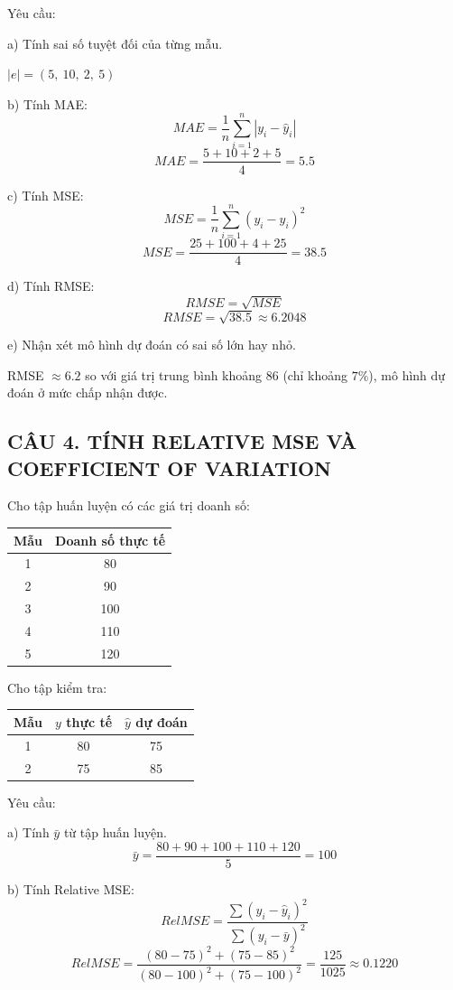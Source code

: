 \documentclass[a4paper,12pt]{article}
\begin{document}
Yêu cầu:

a) Tính sai số tuyệt đối của từng mẫu.

$|e| = (5,\ 10,\ 2,\ 5)$

b) Tính MAE:
\[ MAE = \frac{1}{n}\sum_{i=1}^{n}|y_i - \hat{y}_i| \]
\[ MAE = \frac{5 + 10 + 2 + 5}{4} = 5.5 \]

c) Tính MSE:
\[ MSE = \frac{1}{n}\sum_{i=1}^{n}(y_i - \hat{y}_i)^2 \]
\[ MSE = \frac{25 + 100 + 4 + 25}{4} = 38.5 \]

d) Tính RMSE:
\[ RMSE = \sqrt{MSE} \]
\[ RMSE = \sqrt{38.5} \approx 6.2048 \]

e) Nhận xét mô hình dự đoán có sai số lớn hay nhỏ.

RMSE $\approx 6.2$ so với giá trị trung bình khoảng $86$ (chỉ khoảng $7\%$),
mô hình dự đoán ở mức chấp nhận được.

\subsection*{CÂU 4. TÍNH RELATIVE MSE VÀ COEFFICIENT OF VARIATION}

Cho tập huấn luyện có các giá trị doanh số:
\begin{center}
\begin{tabular}{|c|c|}
\hline
Mẫu & Doanh số thực tế \\
\hline
1 & 80 \\
2 & 90 \\
3 & 100 \\
4 & 110 \\
5 & 120 \\
\hline
\end{tabular}
\end{center}

Cho tập kiểm tra:
\begin{center}
\begin{tabular}{|c|c|c|}
\hline
Mẫu & $y$ thực tế & $\hat{y}$ dự đoán \\
\hline
1 & 80 & 75 \\
2 & 75 & 85 \\
\hline
\end{tabular}
\end{center}

Yêu cầu:

a) Tính $\bar{y}$ từ tập huấn luyện.
\[ \bar{y} = \frac{80 + 90 + 100 + 110 + 120}{5} = 100 \]

b) Tính Relative MSE:
\[ RelMSE = \frac{\sum(y_i - \hat{y}_i)^2}{\sum(y_i - \bar{y})^2} \]
\[ RelMSE = \frac{(80-75)^2 + (75-85)^2}{(80-100)^2 + (75-100)^2} = \frac{125}{1025} \approx 0.1220 \]
\end{document}
